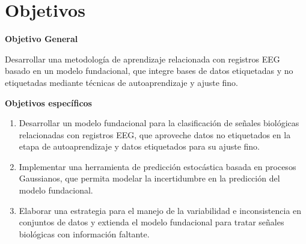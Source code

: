 \section{Objetivos}

\textbf{Objetivo General}

Desarrollar una metodología de aprendizaje relacionada con registros EEG basado en un modelo fundacional, que integre bases de datos etiquetadas y no etiquetadas mediante técnicas de autoaprendizaje y ajuste fino.

\textbf{Objetivos específicos }

\begin{enumerate}
	\item Desarrollar un modelo fundacional para la clasificación de señales biológicas relacionadas con registros EEG, que aproveche datos no etiquetados en la etapa de autoaprendizaje y datos etiquetados para su ajuste fino.
	
	\item Implementar una herramienta de predicción estocástica basada en procesos Gaussianos, que permita modelar la incertidumbre en la predicción del modelo fundacional.
	
	\item Elaborar una estrategia para el manejo de la variabilidad e inconsistencia en conjuntos de datos y extienda el modelo fundacional para tratar señales biológicas con información faltante. 
\end{enumerate}